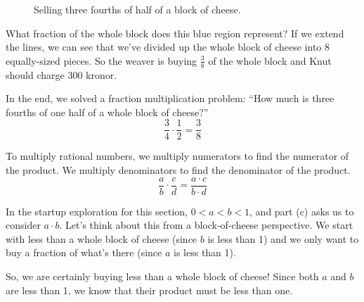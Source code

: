 \begin{figure}[!htbp]
\centering
{}
\caption{Selling three fourths of half of a block of cheese.}
\label{fig:fracmult}
\end{figure}

What fraction of the whole block does this blue region represent? If we extend the lines, we can see that we've divided up the whole block of cheese into 8 equally-sized pieces. So the weaver is buying $\frac{3}{8}$ of the whole block and Knut should charge 300 kronor.

In the end, we solved a fraction multiplication problem: ``How much is three fourths of one half of a whole block of cheese?'' \[\frac{3}{4} \cdot \frac{1}{2} = \frac{3}{8}\] 

\begin{boxeddef}
To multiply rational numbers, we multiply numerators to find the numerator of the product. We multiply denominators to find the denominator of the product. \[\frac{a}{b} \cdot \frac{c}{d} = \frac{a \cdot c}{b \cdot d}\]
\end{boxeddef}

\begin{boxedex}
In the startup exploration for this section, $0 < a < b < 1$, and part (c) asks us to consider $a \cdot b$. Let's think about this from a block-of-cheese perspective. We start with less than a whole block of cheese (since $b$ is less than 1) and we only want to buy a fraction of what's there (since $a$ is less than 1).

So, we are certainly buying less than a whole block of cheese! Since both $a$ and $b$ are less than 1, we know that their product must be less than one.
\end{boxedex}

